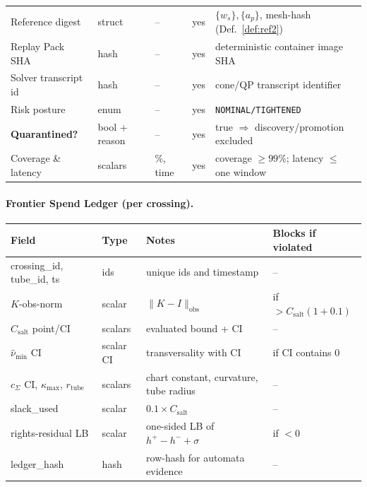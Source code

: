 \begin{center}
\begin{tabularx}{\textwidth}{@{} l l l X X @{}}
Reference digest & struct & – & yes & $\{w_s\},\{a_p\}$, mesh-hash (Def.~\ref{def:ref2}) \\
Replay Pack SHA & hash & – & yes & deterministic container image SHA \\
Solver transcript id & hash & – & yes & cone/QP transcript identifier \\
Risk posture & enum & – & yes & \texttt{NOMINAL/TIGHTENED} \\
\textbf{Quarantined?} & bool + reason & – & yes & true $\Rightarrow$ discovery/promotion excluded \\
Coverage \& latency & scalars & \%, time & yes & coverage $\ge99\%$; latency $\le$ one window \\
\bottomrule
\end{tabularx}
\end{center}

\paragraph{Frontier Spend Ledger (per crossing).}
\begin{center}
\renewcommand{\arraystretch}{1.12}
\begin{tabularx}{\textwidth}{@{} l l X X @{}}
\toprule
\textbf{Field} & \textbf{Type} & \textbf{Notes} & \textbf{Blocks if violated} \\
\midrule
crossing\_id, tube\_id, ts & ids & unique ids and timestamp & – \\
$K$-obs-norm & scalar & $\|K{-}I\|_{\text{obs}}$ & if $>C_{\mathrm{salt}}(1{+}0.1)$ \\
$C_{\mathrm{salt}}$ point/CI & scalars & evaluated bound + CI & – \\
$\hat\nu_{\min}$ CI & scalar CI & transversality with CI & if CI contains $0$ \\
$c_\Sigma$ CI, $\kappa_{\max}$, $r_{\mathrm{tube}}$ & scalars & chart constant, curvature, tube radius & – \\
slack\_used & scalar & $0.1\times C_{\mathrm{salt}}$ & – \\
rights-residual LB & scalar & one-sided LB of $h^+-h^-+\sigma$ & if $<0$ \\
ledger\_hash & hash & row-hash for automata evidence & – \\
\bottomrule
\end{tabularx}
\end{center}

